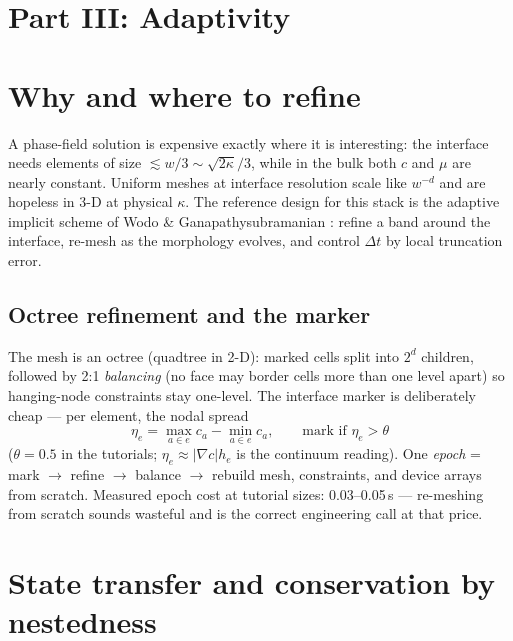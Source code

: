 \documentclass[11pt]{article}
\begin{document}
\section*{Part III: Adaptivity}

\section{Why and where to refine}

A phase-field solution is expensive exactly where it is interesting:
the interface needs elements of size $\lesssim w/3 \sim
\sqrt{2\kappa}/3$, while in the bulk both $c$ and $\mu$ are nearly
constant. Uniform meshes at interface resolution scale like
$w^{-d}$ and are hopeless in 3-D at physical $\kappa$. The reference
design for this stack is the adaptive implicit scheme of Wodo \&
Ganapathysubramanian \cite{wodo2011}: refine a band around the
interface, re-mesh as the morphology evolves, and control $\Delta t$
by local truncation error.

\subsection{Octree refinement and the marker}

The mesh is an octree (quadtree in 2-D): marked cells split into
$2^d$ children, followed by 2:1 \emph{balancing} (no face may border
cells more than one level apart) so hanging-node constraints stay
one-level. The interface marker is deliberately cheap --- per element,
the nodal spread
\begin{equation}
  \eta_e = \max_{a \in e} c_a - \min_{a \in e} c_a,
  \qquad \text{mark if } \eta_e > \theta
\end{equation}
($\theta = 0.5$ in the tutorials; $\eta_e \approx \lvert\nabla c\rvert
h_e$ is the continuum reading). One \emph{epoch} = mark $\to$ refine
$\to$ balance $\to$ rebuild mesh, constraints, and device arrays from
scratch. Measured epoch cost at tutorial sizes: 0.03--0.05\,s ---
re-meshing from scratch sounds wasteful and is the correct engineering
call at that price.

\section{State transfer and conservation by nestedness}
\end{document}
